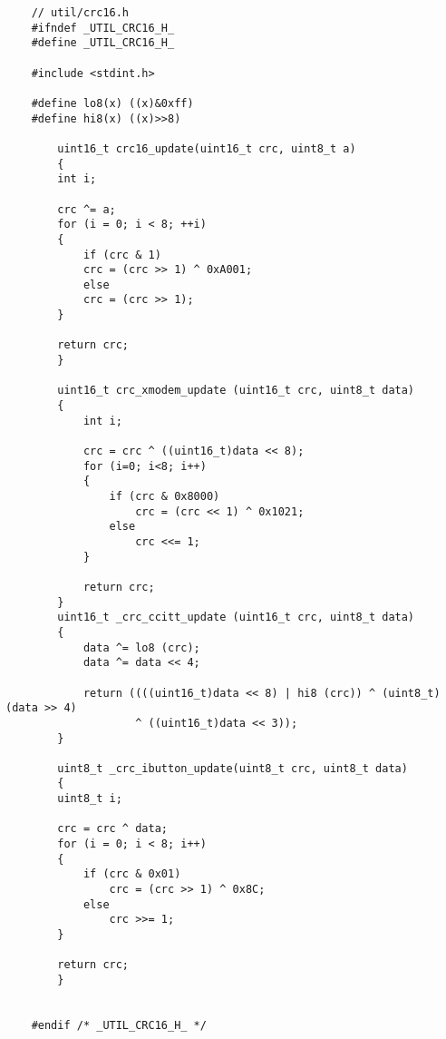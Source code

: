 \begin{verbatim}
    // util/crc16.h
    #ifndef _UTIL_CRC16_H_
    #define _UTIL_CRC16_H_

    #include <stdint.h>

    #define lo8(x) ((x)&0xff) 
    #define hi8(x) ((x)>>8)

        uint16_t crc16_update(uint16_t crc, uint8_t a)
        {
        int i;

        crc ^= a;
        for (i = 0; i < 8; ++i)
        {
            if (crc & 1)
            crc = (crc >> 1) ^ 0xA001;
            else
            crc = (crc >> 1);
        }

        return crc;
        }

        uint16_t crc_xmodem_update (uint16_t crc, uint8_t data)
        {
            int i;

            crc = crc ^ ((uint16_t)data << 8);
            for (i=0; i<8; i++)
            {
                if (crc & 0x8000)
                    crc = (crc << 1) ^ 0x1021;
                else
                    crc <<= 1;
            }

            return crc;
        }
        uint16_t _crc_ccitt_update (uint16_t crc, uint8_t data)
        {
            data ^= lo8 (crc);
            data ^= data << 4;

            return ((((uint16_t)data << 8) | hi8 (crc)) ^ (uint8_t)(data >> 4) 
                    ^ ((uint16_t)data << 3));
        }

        uint8_t _crc_ibutton_update(uint8_t crc, uint8_t data)
        {
        uint8_t i;

        crc = crc ^ data;
        for (i = 0; i < 8; i++)
        {
            if (crc & 0x01)
                crc = (crc >> 1) ^ 0x8C;
            else
                crc >>= 1;
        }

        return crc;
        }


    #endif /* _UTIL_CRC16_H_ */
\end{verbatim}
